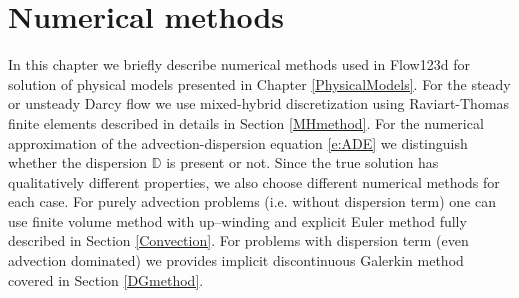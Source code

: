 % 
 \def\abs#1{\lvert#1\rvert}
 \def\argdot{{\hspace{0.18em}\cdot\hspace{0.18em}}}
 \def\avg#1{\left\{#1\right\}}
 \def\D{{\tn D}}
 \def\div{\operatorname{div}}
 \def\Eh{\mathcal E_h}       %
 \def\Ehb{\mathcal E_{h,B}}  %
 \def\Ehcom{\mathcal E_{h,C}}         %
 \def\Ehdir{\mathcal E_{h,D}}         %
 \def\Ehint{\mathcal E_{h,I}}       %
 \def\grad{\nabla}
 \def\jmp#1{[#1]}
 \def\n{\vc n}
 \def\vc#1{\mathbf{\boldsymbol{#1}}}     %
 \def\R{\mathbb R}
 \def\sc#1#2{\left(#1,#2\right)}
 \def\Th{\mathcal T_h}       %
 \def\th{\vartheta}
 \def\tn#1{{\mathbb{#1}}}    %
 \def\Tr{\operatorname{Tr}}
 \def\wavg#1{\avg{#1}_\omega}
 \def\where{\,|\,}
% 


% 


\chapter{Numerical methods}

In this chapter we briefly describe numerical methods used in Flow123d for solution of physical models
presented in Chapter \ref{PhysicalModels}. For the steady or unsteady Darcy flow we use mixed-hybrid discretization using Raviart-Thomas finite elements
described in details in Section \ref{MHmethod}.
For the numerical approximation of the advection-dispersion equation \eqref{e:ADE} we distinguish whether the dispersion $\D$ is present or not.
Since the true solution has qualitatively different properties, we also choose different numerical methods for each case. For purely advection problems
(i.e. without dispersion term) one can use finite volume method with up--winding and explicit Euler method fully described in Section \ref{Convection}.
For problems with dispersion term (even advection dominated) we provides implicit discontinuous Galerkin method covered in Section \ref{DGmethod}.


